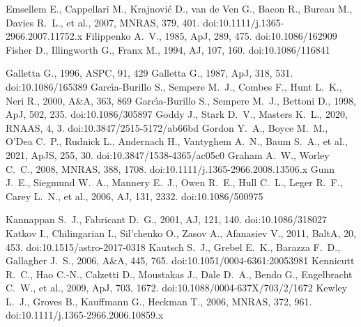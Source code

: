 \documentclass[fleqn,usenatbib]{mnras}
\begin{document}
\begin{thebibliography}{}
 Emsellem E., Cappellari M., Krajnovi{\'c} D., van de Ven G., Bacon R., Bureau M., Davies R.~L., et al., 2007, MNRAS, 379, 401. doi:10.1111/j.1365-2966.2007.11752.x
 Filippenko A.~V., 1985, ApJ, 289, 475. doi:10.1086/162909
 Fisher D., Illingworth G., Franx M., 1994, AJ, 107, 160. doi:10.1086/116841

 Galletta G., 1996, ASPC, 91, 429
 Galletta G., 1987, ApJ, 318, 531. doi:10.1086/165389
 Garc{\'\i}a-Burillo S., Sempere M.~J., Combes F., Hunt L.~K., Neri R., 2000, A\&A, 363, 869
 Garc{\'\i}a-Burillo S., Sempere M.~J., Bettoni D., 1998, ApJ, 502, 235. doi:10.1086/305897
 Goddy J., Stark D.~V., Masters K.~L., 2020, RNAAS, 4, 3. doi:10.3847/2515-5172/ab66bd
 Gordon Y.~A., Boyce M.~M., O'Dea C.~P., Rudnick L., Andernach H., Vantyghem A.~N., Baum S.~A., et al., 2021, ApJS, 255, 30. doi:10.3847/1538-4365/ac05c0
 Graham A.~W., Worley C.~C., 2008, MNRAS, 388, 1708. doi:10.1111/j.1365-2966.2008.13506.x
 Gunn J.~E., Siegmund W.~A., Mannery E.~J., Owen R.~E., Hull C.~L., Leger R.~F., Carey L.~N., et al., 2006, AJ, 131, 2332. doi:10.1086/500975


 Kannappan S.~J., Fabricant D.~G., 2001, AJ, 121, 140. doi:10.1086/318027
 Katkov I., Chilingarian I., Sil'chenko O., Zasov A., Afanasiev V., 2011, BaltA, 20, 453. doi:10.1515/astro-2017-0318
 Kautsch S.~J., Grebel E.~K., Barazza F.~D., Gallagher J.~S., 2006, A\&A, 445, 765. doi:10.1051/0004-6361:20053981
 Kennicutt R.~C., Hao C.-N., Calzetti D., Moustakas J., Dale D.~A., Bendo G., Engelbracht C.~W., et al., 2009, ApJ, 703, 1672. doi:10.1088/0004-637X/703/2/1672
 Kewley L.~J., Groves B., Kauffmann G., Heckman T., 2006, MNRAS, 372, 961. doi:10.1111/j.1365-2966.2006.10859.x


\end{thebibliography}
\end{document}
